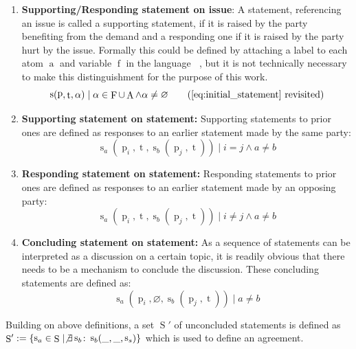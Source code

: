 \documentclass[12pt,msc,a4paper,oneside]{ucl_thesis}
\DeclareMathOperator{\Proplang}{\mathcal{L}(N)}
\DeclareMathOperator{\Propatom}{A}
\DeclareMathOperator{\propatom}{a}
\DeclareMathOperator{\Propvar}{F}
\DeclareMathOperator{\propvar}{f}
\DeclareMathOperator{\Statement}{S}
\DeclareMathOperator{\statement}{s}
\DeclareMathOperator{\statementtext}{t}
\DeclareMathOperator{\party}{p}
\begin{document}
\begin{enumerate}

    \item \textbf{Supporting/Responding statement on issue}: A statement, referencing an issue is called a supporting statement, if it is raised by the party benefiting from the demand and a responding one if it is raised by the party hurt by the issue. Formally this could be defined by attaching a label to each atom $\propatom$ and variable $\propvar$ in the language $\Proplang$, but it is not technically necessary to make this distinguishment for the purpose of this work.
        \begin{equation*}
            \statement(\party, \statementtext, \alpha) \mid \alpha \in \Propvar \cup \Propatom \wedge \alpha \neq \varnothing
            \tag{\ref{eq:initial_statement} revisited}
        \end{equation*}

    \item \textbf{Supporting statement on statement:} Supporting statements to prior ones are defined as responses to an earlier statement made by the same party:
        \begin{equation}
            \statement_a(\party_i, \statementtext, \statement_b(\party_j, \statementtext)) \mid i = j \wedge a \neq b
        \end{equation}

    \item \textbf{Responding statement on statement:} Responding statements to prior ones are defined as responses to an earlier statement made by an opposing party:
        \begin{equation}
            \statement_a(\party_i, \statementtext, \statement_b(\party_j, \statementtext)) \mid i \neq j \wedge a \neq b
        \end{equation}

    \item \textbf{Concluding statement on statement:} As a sequence of statements can be interpreted as a discussion on a certain topic, it is readily obvious that there needs to be a mechanism to conclude the discussion. These concluding statements are defined as:
        \begin{equation}
            \statement_a(\party_i, \varnothing, \statement_b(\party_j, \statementtext)) \mid a \neq b
        \end{equation}
\end{enumerate}

Building on above definitions, a set $\Statement'$ of unconcluded statements is defined as $\Statement' := \{\statement_a \in \Statement \mid \not\exists \statement_b \colon \statement_b(\_,\_,\statement_s)\}$ which is used to define an agreement.
\end{document}

